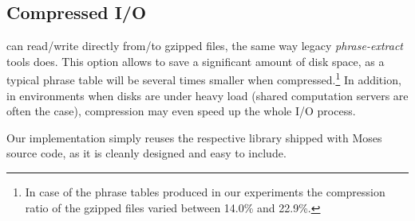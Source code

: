 \subsection{Compressed I/O}

\Eppex{} can read/write directly from/to gzipped files, the same way legacy \emph{phrase-extract}
tools does.
This option allows to save a significant amount of disk space, as a typical phrase table will be
several times smaller when compressed.\footnote{In case of the phrase tables produced in our experiments
the compression ratio of the gzipped files varied between 14.0\% and 22.9\%.}
In addition, in environments when disks are under heavy load (shared computation servers are often
the case), compression may even speed up the whole I/O process.

Our implementation simply reuses the respective library shipped with Moses source code,
as it is cleanly designed and easy to include.

